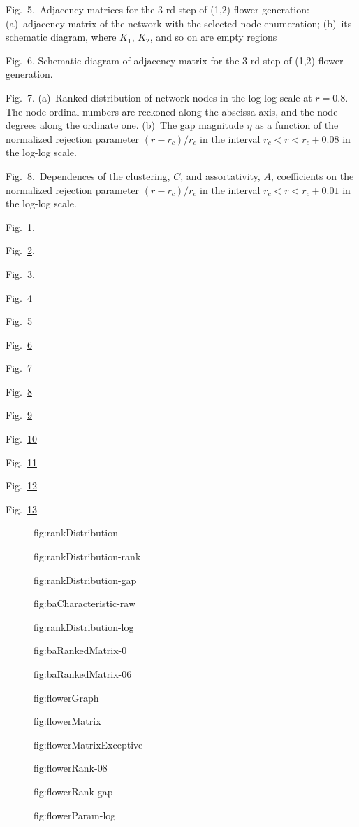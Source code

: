 \documentclass[aps,preprint]{revtex4}%
\newcommand{\dumfig}[1]
{\begin{figure}\caption{#1}\label{#1}\end{figure}}
\begin{document}
Fig.~5.~Adjacency matrices for the 3-rd step of (1,2)-flower generation:
(a)~adjacency matrix of the network with the selected node enumeration;
(b)~its schematic diagram, where $K_{1}$, $K_{2}$, and so on are empty regions

Fig.~6. Schematic diagram of adjacency matrix for the 3-rd step of
(1,2)-flower generation.

Fig.~7. (a)~Ranked distribution of network nodes in the log-log scale at
$r=0.8$. The node ordinal numbers are reckoned along the abscissa axis, and
the node degrees along the ordinate one. (b)~The gap magnitude $\eta$ as a
function of the normalized rejection parameter $(r-r_{c})/r_{c}$ in the
interval $r_{c}<r<r_{c}+0.08$ in the log-log scale.

Fig.~8.~Dependences of the clustering, $C$, and assortativity, $A$,
coefficients on the normalized rejection parameter $(r-r_{c})/r_{c}$ in the
interval $r_{c}<r<r_{c}+0.01$ in the log-log scale.

\newpage

Fig.~\ref{fig:rankDistribution}.

Fig.~\ref{fig:rankDistribution-rank}.

Fig.~\ref{fig:rankDistribution-gap}.

Fig.~\ref{fig:baCharacteristic-raw}

Fig.~\ref{fig:rankDistribution-log}

Fig.~\ref{fig:baRankedMatrix-0}

Fig.~\ref{fig:baRankedMatrix-06}

Fig.~\ref{fig:flowerGraph}

Fig.~\ref{fig:flowerMatrix}

Fig.~\ref{fig:flowerMatrixExceptive}

Fig.~\ref{fig:flowerRank-08}

Fig.~\ref{fig:flowerRank-gap}

Fig.~\ref{fig:flowerParam-log}

\newpage%


\dumfig{fig:rankDistribution} \dumfig{fig:rankDistribution-rank}
\dumfig{fig:rankDistribution-gap} \dumfig{fig:baCharacteristic-raw}
\dumfig{fig:rankDistribution-log} \dumfig{fig:baRankedMatrix-0}
\dumfig{fig:baRankedMatrix-06} \dumfig{fig:flowerGraph}
\dumfig{fig:flowerMatrix} \dumfig{fig:flowerMatrixExceptive}
\dumfig{fig:flowerRank-08} \dumfig{fig:flowerRank-gap} \dumfig{fig:flowerParam-log}
\end{document}
